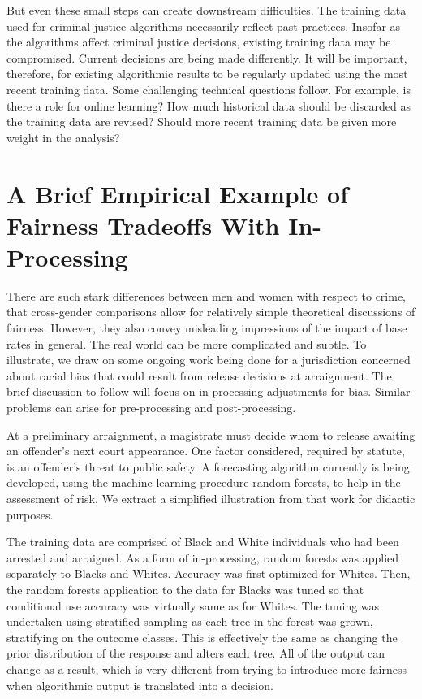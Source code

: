\documentclass[12pt]{article}
\begin{document}
But even these small steps can create downstream difficulties. The training data used for criminal justice algorithms necessarily reflect past practices. Insofar as the algorithms affect criminal justice decisions, existing training data may be compromised. Current decisions are being made differently. It will be important, therefore, for existing algorithmic results to be regularly updated using the most recent training data. Some challenging technical questions follow. For example, is there a role for online learning? How much historical data should be discarded as the training data are revised? Should more recent training data be given more weight in the analysis? 

\section{A Brief Empirical Example of Fairness Tradeoffs With In-Processing}

There are such stark differences between men and women with respect to crime, that cross-gender comparisons allow for relatively simple theoretical discussions of fairness. However, they also convey misleading impressions of the impact of base rates in general. The real world can be more complicated and subtle. To illustrate, we draw on some ongoing work being done for a jurisdiction concerned about racial bias that could result from release decisions at arraignment. The brief discussion to follow will focus on in-processing adjustments for bias. Similar problems can arise for pre-processing and post-processing. 

At a preliminary arraignment, a magistrate must decide whom to release awaiting an offender's next court appearance. One factor considered, required by statute, is an offender's threat to public safety. A forecasting algorithm currently is being developed, using the machine learning procedure random forests, to help in the assessment of risk. We extract a simplified illustration from that work for didactic purposes.
 
The training data are comprised of Black and White individuals who had been arrested and arraigned. As a form of in-processing, random forests was applied separately to Blacks and Whites. Accuracy was first optimized for Whites. Then, the random forests application to the data for Blacks was tuned so that conditional use accuracy was virtually same as for Whites. The tuning was undertaken using stratified sampling as each tree in the forest was grown, stratifying on the outcome classes. This is effectively the same as changing the prior distribution of the response and alters each tree. All of the output can change as a result, which is very different from trying to introduce more fairness when algorithmic output is translated into a decision.
\end{document}
